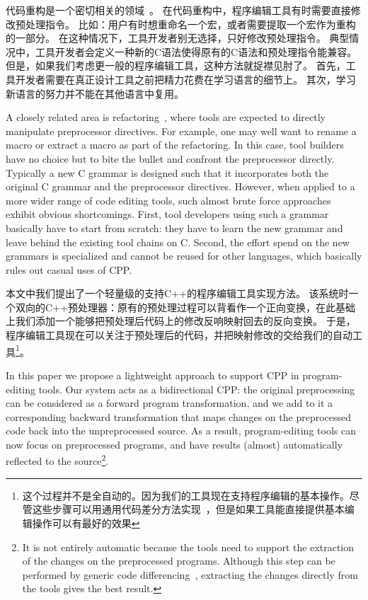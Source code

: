 代码重构是一个密切相关的领域~\parencite{McCloskey:2005,Garrido2013}。
在代码重构中，程序编辑工具有时需要直接修改预处理指令。
比如：用户有时想重命名一个宏，或者需要提取一个宏作为重构的一部分。
在这种情况下，工具开发者别无选择，只好修改预处理指令。
典型情况中，工具开发者会定义一种新的C语法使得原有的C语法和预处理指令能兼容。
但是，如果我们考虑更一般的程序编辑工具，这种方法就捉襟见肘了。
首先，工具开发者需要在真正设计工具之前把精力花费在学习语言的细节上。
其次，学习新语言的努力并不能在其他语言中复用。

A closely related area is refactoring~\parencite{McCloskey:2005,Garrido2013}, where tools are expected to directly manipulate preprocessor directives. For example, one may well want to rename a macro or extract a macro as part of the refactoring. In this case, tool builders have no choice but to bite the bullet and confront the preprocessor directly. 
    Typically a new C grammar is designed such that it
incorporates both the original C grammar and the preprocessor
directives. 
However, when applied to a more wider range of
code editing tools, such almost brute force approaches exhibit obvious shortcomings.
First, tool developers using such a grammar basically have to start from scratch: 
they have to learn the new grammar and leave behind the existing tool
chains on C. Second, the effort spend on the new grammars is specialized and
cannot be reused for other languages, which basically rules out  casual uses of CPP. 

本文中我们提出了一个轻量级的支持C++的程序编辑工具实现方法。
该系统时一个双向的C++预处理器：原有的预处理过程可以背看作一个正向变换，在此基础上我们添加一个能够把预处理后代码上的修改反响映射回去的反向变换。
于是，程序编辑工具现在可以关注于预处理后的代码，并把映射修改的交给我们的自动工具\footnote{这个过程并不是全自动的。因为我们的工具现在支持程序编辑的基本操作。尽管这些步骤可以用通用代码差分方法实现~\parencite{fluri2007change}，但是如果工具能直接提供基本编辑操作可以有最好的效果}。

In this paper we propose a lightweight approach to support
CPP in program-editing tools. Our system acts as a
bidirectional CPP: the original preprocessing can be
considered as a forward program transformation, and we add to it a corresponding 
backward transformation that maps changes on the preprocessed
code back into the unpreprocessed source. As a result, program-editing tools can now focus on preprocessed programs, and have results (almost) automatically reflected to the source\footnote{It is not entirely automatic because the tools need to support the extraction of the changes on the preprocessed programs. Although this step can be performed by generic code differencing~\parencite{fluri2007change}, extracting the changes directly from the tools gives the best
result.}.



